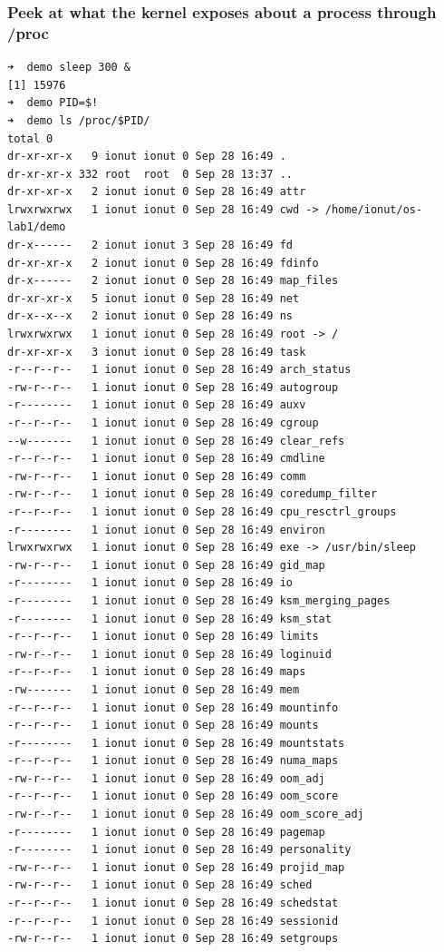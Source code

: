 \documentclass{labreport}
\begin{document}
\subsubsection{Peek at what the kernel exposes about a process through /proc}
\begin{lstlisting}[style=bash]
➜  demo sleep 300 &
[1] 15976
➜  demo PID=$!
➜  demo ls /proc/$PID/
total 0
dr-xr-xr-x   9 ionut ionut 0 Sep 28 16:49 .
dr-xr-xr-x 332 root  root  0 Sep 28 13:37 ..
dr-xr-xr-x   2 ionut ionut 0 Sep 28 16:49 attr
lrwxrwxrwx   1 ionut ionut 0 Sep 28 16:49 cwd -> /home/ionut/os-lab1/demo
dr-x------   2 ionut ionut 3 Sep 28 16:49 fd
dr-xr-xr-x   2 ionut ionut 0 Sep 28 16:49 fdinfo
dr-x------   2 ionut ionut 0 Sep 28 16:49 map_files
dr-xr-xr-x   5 ionut ionut 0 Sep 28 16:49 net
dr-x--x--x   2 ionut ionut 0 Sep 28 16:49 ns
lrwxrwxrwx   1 ionut ionut 0 Sep 28 16:49 root -> /
dr-xr-xr-x   3 ionut ionut 0 Sep 28 16:49 task
-r--r--r--   1 ionut ionut 0 Sep 28 16:49 arch_status
-rw-r--r--   1 ionut ionut 0 Sep 28 16:49 autogroup
-r--------   1 ionut ionut 0 Sep 28 16:49 auxv
-r--r--r--   1 ionut ionut 0 Sep 28 16:49 cgroup
--w-------   1 ionut ionut 0 Sep 28 16:49 clear_refs
-r--r--r--   1 ionut ionut 0 Sep 28 16:49 cmdline
-rw-r--r--   1 ionut ionut 0 Sep 28 16:49 comm
-rw-r--r--   1 ionut ionut 0 Sep 28 16:49 coredump_filter
-r--r--r--   1 ionut ionut 0 Sep 28 16:49 cpu_resctrl_groups
-r--------   1 ionut ionut 0 Sep 28 16:49 environ
lrwxrwxrwx   1 ionut ionut 0 Sep 28 16:49 exe -> /usr/bin/sleep
-rw-r--r--   1 ionut ionut 0 Sep 28 16:49 gid_map
-r--------   1 ionut ionut 0 Sep 28 16:49 io
-r--------   1 ionut ionut 0 Sep 28 16:49 ksm_merging_pages
-r--------   1 ionut ionut 0 Sep 28 16:49 ksm_stat
-r--r--r--   1 ionut ionut 0 Sep 28 16:49 limits
-rw-r--r--   1 ionut ionut 0 Sep 28 16:49 loginuid
-r--r--r--   1 ionut ionut 0 Sep 28 16:49 maps
-rw-------   1 ionut ionut 0 Sep 28 16:49 mem
-r--r--r--   1 ionut ionut 0 Sep 28 16:49 mountinfo
-r--r--r--   1 ionut ionut 0 Sep 28 16:49 mounts
-r--------   1 ionut ionut 0 Sep 28 16:49 mountstats
-r--r--r--   1 ionut ionut 0 Sep 28 16:49 numa_maps
-rw-r--r--   1 ionut ionut 0 Sep 28 16:49 oom_adj
-r--r--r--   1 ionut ionut 0 Sep 28 16:49 oom_score
-rw-r--r--   1 ionut ionut 0 Sep 28 16:49 oom_score_adj
-r--------   1 ionut ionut 0 Sep 28 16:49 pagemap
-r--------   1 ionut ionut 0 Sep 28 16:49 personality
-rw-r--r--   1 ionut ionut 0 Sep 28 16:49 projid_map
-rw-r--r--   1 ionut ionut 0 Sep 28 16:49 sched
-r--r--r--   1 ionut ionut 0 Sep 28 16:49 schedstat
-r--r--r--   1 ionut ionut 0 Sep 28 16:49 sessionid
-rw-r--r--   1 ionut ionut 0 Sep 28 16:49 setgroups

\end{lstlisting}
\end{document}
